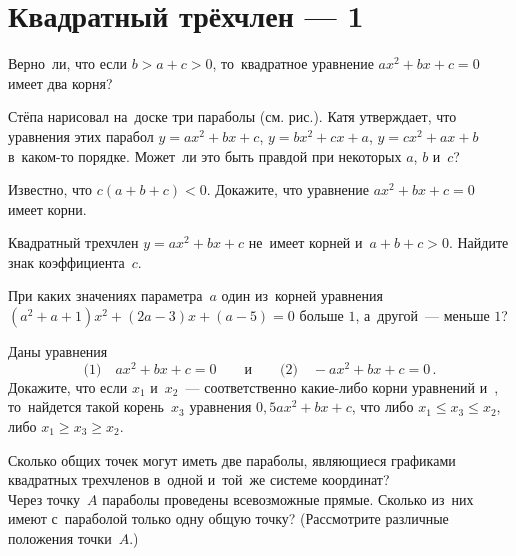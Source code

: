 
\section*{Квадратный трёхчлен --- 1}


\begin{problems}

\item
Верно~ли, что если $b > a + c > 0$, то~квадратное уравнение
$a x^2 + bx + c = 0$ имеет два корня?

\item
Стёпа нарисовал на~доске три параболы (см. рис.).
Катя утверждает, что уравнения этих парабол
$y = a x^2 + b x + c$, $y = bx^2 + c x + a$, $y = cx^2 + ax + b$ в~каком-то
порядке.
Может~ли это быть правдой при некоторых $a$, $b$ и~$c$?
\begin{center}
\end{center}

\item
Известно, что $c (a + b + c) < 0$.
Докажите, что уравнение $a x^2 + b x + c = 0$ имеет корни.

\item
Квадратный трехчлен $y = a x^2 + bx + c$ не~имеет корней и~$a + b + c > 0$.
Найдите знак коэффициента~$c$.

\item
При каких значениях параметра~$a$ один из~корней уравнения
$(a^2 + a + 1) x^2 + (2 a - 3) x + (a - 5) = 0$
больше $1$, а~другой~--- меньше $1$?

\item
Даны уравнения
\[
\text{(1)}\quad
    a x^2 + b x + c = 0
\qquad\text{и}\qquad
\text{(2)}\quad
    -a x^2 + b x + c = 0
\, . \]
Докажите, что если $x_1$ и~$x_2$~--- соответственно какие-либо корни уравнений
 и~, то~найдется такой корень~$x_3$ уравнения
$0{,}5 a x^2 + b x + c$, что либо
$x_1 \leq x_3 \leq x_2$, либо $x_1 \geq x_3 \geq x_2$.

\item
\subproblem
Сколько общих точек могут иметь две параболы, являющиеся графиками квадратных
трехчленов в~одной и~той~же системе координат?
\\
\subproblem
Через точку~$A$ параболы проведены всевозможные прямые.
Сколько из~них имеют с~параболой только одну общую точку?
(Рассмотрите различные положения точки~$A$.)

\end{problems}


